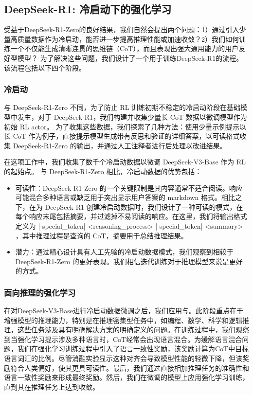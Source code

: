 \documentclass[11pt, a4paper, logo, copyright, nonumbering]{deepseek}
\newcommand{\dsri}{DeepSeek-R1}
\newcommand{\dsro}{DeepSeek-R1-Zero}
\begin{document}
\subsection{\dsri{}: 冷启动下的强化学习}
受益于\dsro{}的良好结果，我们自然会提出两个问题：1）通过引入少量高质量数据作为冷启动，能否进一步提高推理性能或加速收敛？2）我们如何训练一个不仅能生成清晰连贯的思维链（CoT），而且表现出强大通用能力的用户友好型模型？
为了解决这些问题，我们设计了一个用于训练\dsri{}的流程。该流程包括以下四个阶段。
\subsubsection{冷启动}
与 \dsro{} 不同，为了防止 RL 训练初期不稳定的冷启动阶段在基础模型中发生，对于 DeepSeek-R1，我们构建并收集少量长 CoT 数据以微调模型作为初始 RL actor。
为了收集这些数据，我们探索了几种方法：使用少量示例提示以长 CoT 作为例子，直接提示模型生成带有反思和验证的详细答案，以可读格式收集 \dsro{} 的输出，并通过人工注释者进行后处理以改进结果。

在这项工作中，我们收集了数千个冷启动数据以微调 DeepSeek-V3-Base 作为 RL 的起始点。
与 \dsro{} 相比，冷启动数据的优势包括：
\begin{itemize}[topsep=0pt]
    \item
可读性：\dsro{} 的一个关键限制是其内容通常不适合阅读。响应可能混合多种语言或缺乏用于突出显示用户答案的 markdown 格式。相比之下，在为 \dsri{} 创建冷启动数据时，我们设计了一种可读的模式，在每个响应末尾包括摘要，并过滤掉不易阅读的响应。在这里，我们将输出格式定义为 | special\_token| <reasoning\_process> | special\_token| <summary> ，其中推理过程是查询的 CoT，摘要用于总结推理结果。

 \item
潜力：通过精心设计具有人工先验的冷启动数据模式，我们观察到相较于 \dsro{} 的更好表现。我们相信迭代训练对于推理模型来说是更好的方式。
\end{itemize}
\subsubsection{面向推理的强化学习}
在对DeepSeek-V3-Base进行冷启动数据微调之后，我们应用与。此阶段重点在于增强模型的推理能力，特别是在推理密集型任务中，如编程、数学、科学和逻辑推理，这些任务涉及具有明确解决方案的明确定义的问题。在训练过程中，我们观察到当强化学习提示涉及多种语言时，CoT经常会出现语言混合。为缓解语言混合问题，我们在强化学习训练过程中引入了语言一致性奖励，该奖励计算为CoT中目标语言词汇的比例。尽管消融实验显示这种对齐会导致模型性能的轻微下降，但该奖励符合人类偏好，使其更具可读性。最后，我们通过直接相加推理任务的准确性和语言一致性奖励来形成最终奖励。然后，我们在微调的模型上应用强化学习训练，直到其在推理任务上达到收敛。
\end{document}
